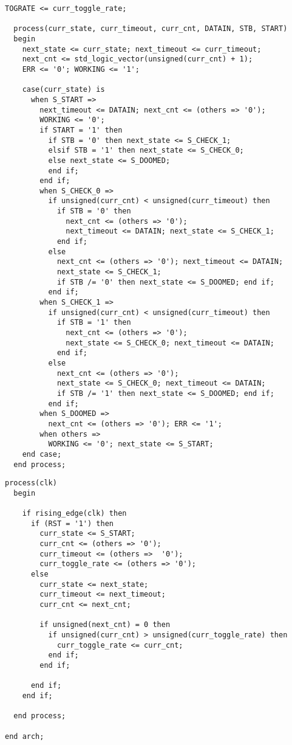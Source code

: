 \begin{lstlisting}[style=vhdl, caption={Watchdog FSM - VHDL Code (Combinational process)}]
  TOGRATE <= curr_toggle_rate;

  process(curr_state, curr_timeout, curr_cnt, DATAIN, STB, START)
  begin
    next_state <= curr_state; next_timeout <= curr_timeout;
    next_cnt <= std_logic_vector(unsigned(curr_cnt) + 1);
    ERR <= '0'; WORKING <= '1';

    case(curr_state) is
      when S_START =>
        next_timeout <= DATAIN; next_cnt <= (others => '0');
        WORKING <= '0';
        if START = '1' then
          if STB = '0' then next_state <= S_CHECK_1;
          elsif STB = '1' then next_state <= S_CHECK_0;
          else next_state <= S_DOOMED;
          end if;
        end if;
        when S_CHECK_0 =>
          if unsigned(curr_cnt) < unsigned(curr_timeout) then
            if STB = '0' then
              next_cnt <= (others => '0');
              next_timeout <= DATAIN; next_state <= S_CHECK_1;
            end if;
          else
            next_cnt <= (others => '0'); next_timeout <= DATAIN;
            next_state <= S_CHECK_1;
            if STB /= '0' then next_state <= S_DOOMED; end if;
          end if;
        when S_CHECK_1 =>
          if unsigned(curr_cnt) < unsigned(curr_timeout) then
            if STB = '1' then
              next_cnt <= (others => '0');
              next_state <= S_CHECK_0; next_timeout <= DATAIN;
            end if;
          else
            next_cnt <= (others => '0');
            next_state <= S_CHECK_0; next_timeout <= DATAIN;
            if STB /= '1' then next_state <= S_DOOMED; end if;
          end if;
        when S_DOOMED =>
          next_cnt <= (others => '0'); ERR <= '1';
        when others =>
          WORKING <= '0'; next_state <= S_START;
    end case;
  end process;
\end{lstlisting}

\begin{lstlisting}[style=vhdl, caption={Watchdog FSM - VHDL Code (Sequential process)}]
  process(clk)
  begin

    if rising_edge(clk) then
      if (RST = '1') then
        curr_state <= S_START;
        curr_cnt <= (others => '0');
        curr_timeout <= (others =>  '0');
        curr_toggle_rate <= (others => '0');
      else
        curr_state <= next_state;
        curr_timeout <= next_timeout;
        curr_cnt <= next_cnt;

        if unsigned(next_cnt) = 0 then
          if unsigned(curr_cnt) > unsigned(curr_toggle_rate) then
            curr_toggle_rate <= curr_cnt;
          end if;
        end if;

      end if;
    end if;

  end process;

end arch;

\end{lstlisting}

